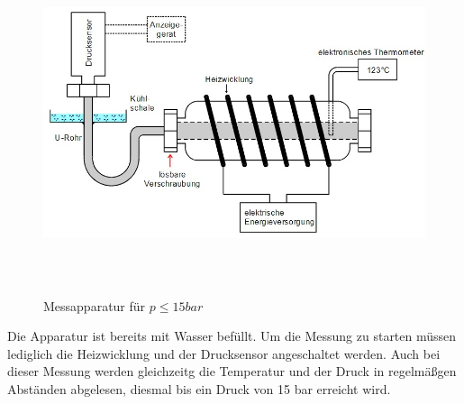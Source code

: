 \begin{figure}
  \centering
  \includegraphics[height=10cm]{Aufbau2.jpg}
  \caption{Messapparatur für $p ≤ 15 bar$}
  \label{fig:aufbau2}
\end{figure}

Die Apparatur ist bereits mit Wasser befüllt. Um die Messung zu starten müssen
lediglich die Heizwicklung und der Drucksensor angeschaltet werden. Auch bei
dieser Messung werden gleichzeitg die Temperatur und der Druck in regelmäßgen
Abständen abgelesen, diesmal bis ein Druck von 15 bar erreicht wird.

